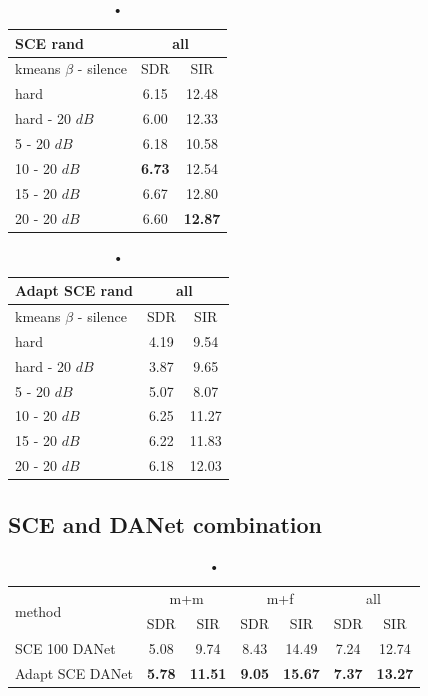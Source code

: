 \documentclass[master, tikz, final,11pt, dvipdfmx]{iscs-thesis}
\begin{document}
\begin{table}[h!]
\begin{subtable}{.5\linewidth}
\centering
\begin{tabular}{l|c|c}
SCE rand & \multicolumn{2}{c}{all} \\  
\hline 
kmeans $\beta$ - silence & SDR & SIR  \\ 
\hline
hard  & 6.15 & 12.48  \\ 
hard - 20 $dB$  & 6.00 & 12.33 \\
\hline
\hline
5 - 20 $dB$  & 6.18 & 10.58 \\ 
10 - 20 $dB$  & \cellcolor{green}\textbf{6.73} & \cellcolor{green}12.54 \\ 
15 - 20 $dB$ & 6.67 & 12.80  \\ 
20 - 20 $dB$ & 6.60 & \textbf{12.87}  \\ 
\end{tabular}
\caption{•}
\label{table:SCE100NSbest}
\end{subtable}%
\begin{subtable}{.5\linewidth}
\centering
\begin{tabular}{l|c|c}
Adapt SCE rand & \multicolumn{2}{c}{all} \\  
\hline 
kmeans $\beta$ - silence & SDR & SIR  \\ 
\hline
hard  & 4.19 & 9.54  \\ 
hard - 20 $dB$  & 3.87 & 9.65 \\
\hline
\hline
5 - 20 $dB$  & 5.07 & 8.07 \\ 
10 - 20 $dB$  & 6.25 & 11.27 \\ 
15 - 20 $dB$ & 6.22 & 11.83  \\ 
20 - 20 $dB$ & 6.18 & 12.03  \\ 
\end{tabular}
\caption{•}
\end{subtable}
\caption{•}
\end{table}

\lipsum[1]


\subsection{SCE and DANet combination}
\label{DANET}

\lipsum[1]

\begin{table}[h!]
\centering
\begin{tabular}{l|c|c|c|c|c|c}
 \multirow{2}{*}{method}   & \multicolumn{2}{c|}{m+m} & \multicolumn{2}{c|}{m+f} & \multicolumn{2}{c}{all} \\ 
\cline{2-7}
 & SDR & SIR & SDR & SIR & SDR & SIR \\ 
\hline 
SCE 100 DANet & 5.08 & 9.74 & 8.43 & 14.49 & 7.24 & 12.74 \\ 
Adapt SCE DANet & \textbf{5.78} & \textbf{11.51} & \textbf{9.05} & \textbf{15.67} & \textbf{7.37} & \textbf{13.27} \\  
\end{tabular}
\captionsetup{justification=centering}
\caption{•}
\label{table:SCE100DANETrecap}
\end{table}
\end{document}
